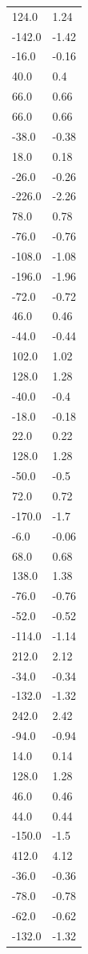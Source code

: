 \begin{longtable}{ll}
124.0 & 1.24 \\
-142.0 & -1.42 \\
-16.0 & -0.16 \\
40.0 & 0.4 \\
66.0 & 0.66 \\
66.0 & 0.66 \\
-38.0 & -0.38 \\
18.0 & 0.18 \\
-26.0 & -0.26 \\
-226.0 & -2.26 \\
78.0 & 0.78 \\
-76.0 & -0.76 \\
-108.0 & -1.08 \\
-196.0 & -1.96 \\
-72.0 & -0.72 \\
46.0 & 0.46 \\
-44.0 & -0.44 \\
102.0 & 1.02 \\
128.0 & 1.28 \\
-40.0 & -0.4 \\
-18.0 & -0.18 \\
22.0 & 0.22 \\
128.0 & 1.28 \\
-50.0 & -0.5 \\
72.0 & 0.72 \\
-170.0 & -1.7 \\
-6.0 & -0.06 \\
68.0 & 0.68 \\
138.0 & 1.38 \\
-76.0 & -0.76 \\
-52.0 & -0.52 \\
-114.0 & -1.14 \\
212.0 & 2.12 \\
-34.0 & -0.34 \\
-132.0 & -1.32 \\
242.0 & 2.42 \\
-94.0 & -0.94 \\
14.0 & 0.14 \\
128.0 & 1.28 \\
46.0 & 0.46 \\
44.0 & 0.44 \\
-150.0 & -1.5 \\
412.0 & 4.12 \\
-36.0 & -0.36 \\
-78.0 & -0.78 \\
-62.0 & -0.62 \\
-132.0 & -1.32 \\

\end{longtable}
